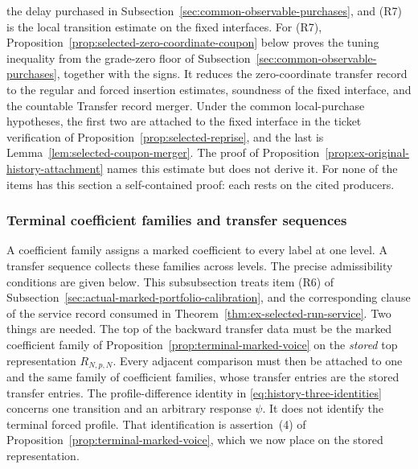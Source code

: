 the delay purchased in Subsection~\ref{sec:common-observable-purchases},
and (R7) is the local transition estimate on the fixed interfaces. For
(R7), Proposition~\ref{prop:selected-zero-coordinate-coupon} below
proves the tuning inequality from the grade-zero floor of
Subsection~\ref{sec:common-observable-purchases}, together with the signs.
It reduces the zero-coordinate transfer record to the regular and forced
insertion estimates, soundness of the fixed interface, and the countable
Transfer record merger. Under the common local-purchase hypotheses, the
first two are attached to the fixed interface in the ticket verification
of Proposition~\ref{prop:selected-reprise}, and the last is
Lemma~\ref{lem:selected-coupon-merger}.
The proof of Proposition~\ref{prop:ex-original-history-attachment}
names this estimate but does not derive it. For none of the items has
this section a self-contained proof: each rests on the cited
producers.

\subsubsection{Terminal coefficient families and transfer sequences}
\label{sec:selected-terminal-voice}

A coefficient family assigns a marked coefficient to every label at
one level. A transfer sequence collects these families across levels.
The precise admissibility conditions are given below.
This subsubsection treats item (R6) of
Subsection~\ref{sec:actual-marked-portfolio-calibration}, and the
corresponding clause of the service record consumed in
Theorem~\ref{thm:ex-selected-run-service}. Two things are needed. The
top of the backward transfer data must be the marked coefficient family of
Proposition~\ref{prop:terminal-marked-voice} on the \emph{stored} top
representation $R_{N,p,N}$. Every adjacent comparison must then be
attached to one and the same family of coefficient families, whose transfer entries are the
stored transfer entries. The profile-difference identity in
\eqref{eq:history-three-identities} concerns one transition and an
arbitrary response $\psi$. It does not identify the terminal forced
profile. That identification is assertion~(4) of
Proposition~\ref{prop:terminal-marked-voice}, which we now place on the
stored representation.

